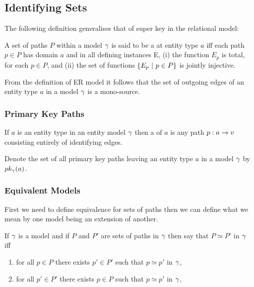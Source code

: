 \subsection{Identifying Sets}

The following definition generalises that of super key in the relational model:
\begin{definition}
A set of paths $P$  within a model $\gamma$ is said to be a  at entity type $a$
iff each path $p \in P$ has domain $a$ and  in all defining instances E, 
(i) the function $E_p$ is total, for each $p \in P$, and (ii) the set of functions
$\left\{E_p \ \middle|\ p\in P\right\}$ is jointly injective.
\end{definition}

From the definition of ER model it follows that the set of outgoing edges of an entity type 
$a$ in a model $\gamma$ is a mono-source. 
\subsubsection{Primary Key Paths}
\label{primarykeypath}
\begin{definition}
If $a$ is an entity type in an entity model $\gamma$ then a 
of $a$ is any path $p:a \rightarrow v$ consisting entirely of identifying edges. 
\end{definition}

Denote the set of all primary key paths leaving an entity type $a$ in a model $\gamma$ by 
$pk_{\gamma}(a)$.

\subsubsection{Equivalent Models}

First we need to define equivalence for sets of paths then we can define what we mean by 
one model being an extension of another.
\begin{definition}
If $\gamma$ is a model and if $P$ and $P'$ are sets of paths in $\gamma$ then say that
$P \simeq P'$ in $\gamma$ iff
\begin{enumerate}
\item for all $p \in P$ there exists $p' \in P'$ such that $p \simeq p'$ in $\gamma$,
\item for all $p' \in P'$ there exists $p \in P$ such that $p \simeq p'$ in $\gamma$,
\end{enumerate} 
\end{definition}

